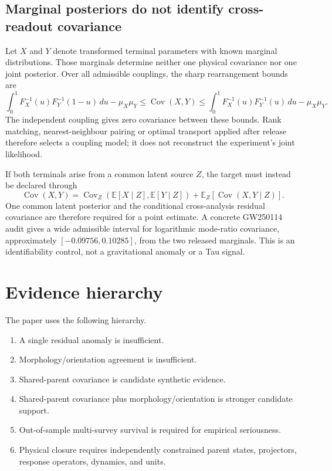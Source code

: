 \documentclass[12pt]{article}
\begin{document}
\subsection{Marginal posteriors do not identify cross-readout covariance}

Let $X$ and $Y$ denote transformed terminal parameters with known marginal
distributions.  Those marginals determine neither one physical covariance nor
one joint posterior.  Over all admissible couplings, the sharp rearrangement
bounds are
\begin{equation}
 \int_0^1 F_X^{-1}(u)F_Y^{-1}(1-u)\,du-\mu_X\mu_Y
 \leq \operatorname{Cov}(X,Y)
 \leq
 \int_0^1 F_X^{-1}(u)F_Y^{-1}(u)\,du-\mu_X\mu_Y.
 \label{eq:paper17-frechet-covariance-bounds}
\end{equation}
The independent coupling gives zero covariance between these bounds.  Rank
matching, nearest-neighbour pairing or optimal transport applied after release
therefore selects a coupling model; it does not reconstruct the experiment's
joint likelihood.

If both terminals arise from a common latent source $Z$, the target must
instead be declared through
\begin{equation}
 \operatorname{Cov}(X,Y)
 =\operatorname{Cov}_Z\!\left(\mathbb E[X\mid Z],
                              \mathbb E[Y\mid Z]\right)
 +\mathbb E_Z[\operatorname{Cov}(X,Y\mid Z)].
 \label{eq:paper17-total-covariance}
\end{equation}
One common latent posterior and the conditional cross-analysis residual
covariance are therefore required for a point estimate.  A concrete
GW250114 audit gives a wide admissible interval for logarithmic mode-ratio
covariance, approximately $[-0.09756,0.10285]$, from the two released
marginals.  This is an identifiability control, not a gravitational anomaly
or a Tau signal.

\section{Evidence hierarchy}

The paper uses the following hierarchy.

\begin{enumerate}[leftmargin=1.4em]
\item A single residual anomaly is insufficient.
\item Morphology/orientation agreement is insufficient.
\item Shared-parent covariance is candidate synthetic evidence.
\item Shared-parent covariance plus morphology/orientation is stronger
candidate support.
\item Out-of-sample multi-survey survival is required for empirical seriousness.
\item Physical closure requires independently constrained parent states,
projectors, response operators, dynamics, and units.
\end{enumerate}
\end{document}
